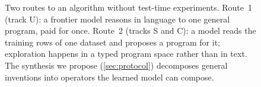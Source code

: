 \begin{figure}[h]
\centering

\caption{Two routes to an algorithm without test-time experiments. Route~1 (track U): a frontier
model reasons in language to one general program, paid for once. Route~2 (tracks S and C): a
model reads the training rows of one dataset and proposes a program for it; exploration happens in
a typed program space rather than in text. The synthesis we propose (\cref{sec:protocol})
decomposes general inventions into operators the learned model can compose.}
\label{fig:routes}
\end{figure}
